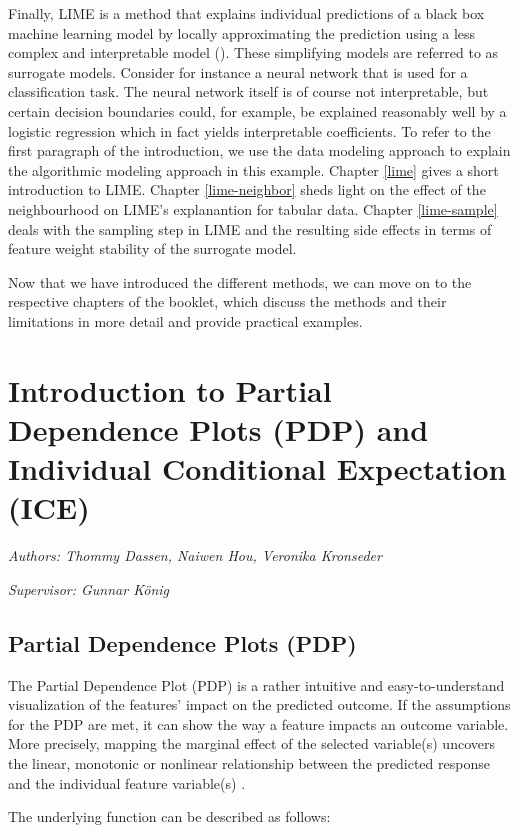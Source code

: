 \documentclass[]{krantz}
\begin{document}
Finally, LIME is a method that explains individual predictions of a
black box machine learning model by locally approximating the prediction
using a less complex and interpretable model (\citet{molnar2019}). These
simplifying models are referred to as surrogate models. Consider for
instance a neural network that is used for a classification task. The
neural network itself is of course not interpretable, but certain
decision boundaries could, for example, be explained reasonably well by
a logistic regression which in fact yields interpretable coefficients.
To refer to the first paragraph of the introduction, we use the data
modeling approach to explain the algorithmic modeling approach in this
example. Chapter \ref{lime} gives a short introduction to LIME. Chapter
\ref{lime-neighbor} sheds light on the effect of the neighbourhood on
LIME's explanantion for tabular data. Chapter \ref{lime-sample} deals
with the sampling step in LIME and the resulting side effects in terms
of feature weight stability of the surrogate model.

Now that we have introduced the different methods, we can move on to the
respective chapters of the booklet, which discuss the methods and their
limitations in more detail and provide practical examples.

\chapter{Introduction to Partial Dependence Plots (PDP) and Individual
Conditional Expectation (ICE)}\label{pdp}

\emph{Authors: Thommy Dassen, Naiwen Hou, Veronika Kronseder}

\emph{Supervisor: Gunnar König}

\section{Partial Dependence Plots
(PDP)}\label{partial-dependence-plots-pdp}

The Partial Dependence Plot (PDP) is a rather intuitive and
easy-to-understand visualization of the features' impact on the
predicted outcome. If the assumptions for the PDP are met, it can show
the way a feature impacts an outcome variable. More precisely, mapping
the marginal effect of the selected variable(s) uncovers the linear,
monotonic or nonlinear relationship between the predicted response and
the individual feature variable(s) \citep{molnar2019}.

The underlying function can be described as follows:
\end{document}
